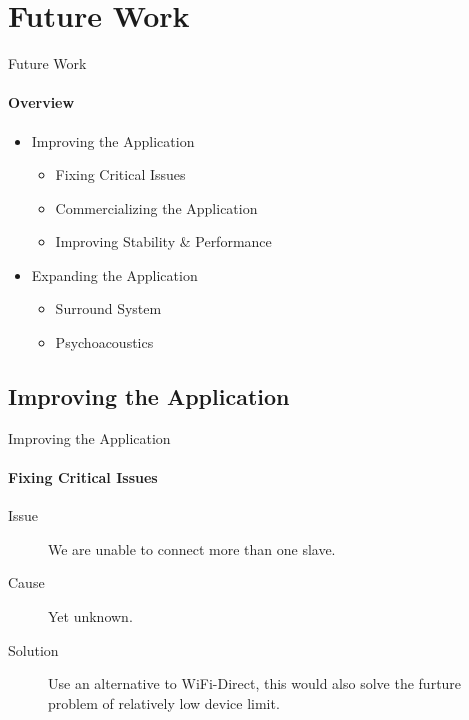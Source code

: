 \section{Future Work}
\author{Marc}
\begin{frame}{Future Work}
    \framesubtitle{Overview}
    \begin{itemize}
        \item{Improving the Application}
        \begin{itemize}
            \item Fixing Critical Issues
            \item Commercializing the Application
            \item Improving Stability \& Performance
        \end{itemize}
        \item{Expanding the Application}
        \begin{itemize}
            \item Surround System
            \item Psychoacoustics
        \end{itemize}
    \end{itemize}
\end{frame}

\subsection{Improving the Application}
\begin{frame}{Improving the Application}
    \framesubtitle{Fixing Critical Issues}
    \begin{description}
        \item [Issue] We are unable to connect more than one slave.
        \item [Cause] Yet unknown.
        \item [Solution] Use an alternative to WiFi-Direct, this would also solve the furture problem of relatively low device limit. %
    \end{description}
\end{frame}

